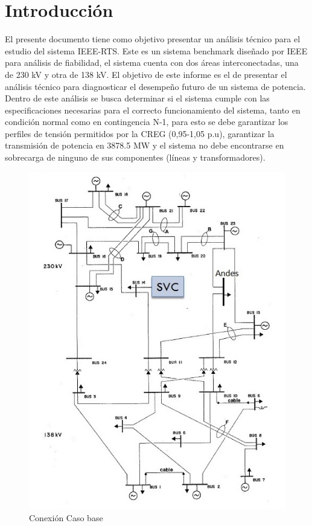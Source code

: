 \documentclass{article}
\begin{document}
\newpage
\section{Introducción}
El presente documento tiene como objetivo presentar un análisis técnico para el estudio del sistema IEEE-RTS. Este es un sistema benchmark diseñado por IEEE para análisis de fiabilidad, el sistema cuenta con dos áreas interconectadas, una de 230 kV y otra de 138 kV. El objetivo de este informe es el de presentar el análisis técnico para diagnosticar el desempeño futuro de un sistema de potencia. Dentro de este análisis se busca determinar si el sistema cumple con las especificaciones necesarias para el correcto funcionamiento del sistema, tanto en condición normal como en contingencia N-1, para esto se debe garantizar los perfiles de tensión permitidos por la CREG (0,95-1,05 p.u), garantizar la transmisión de potencia en 3878.5 MW y el sistema no debe encontrarse en sobrecarga de ninguno de sus componentes (líneas y transformadores).

\begin{figure}[H]
    \centering
    \includegraphics{UnifilarEscenario1.jpg}
    \caption{Conexión Caso base}
    \label{CasoBase}
\end{figure}
\end{document}
